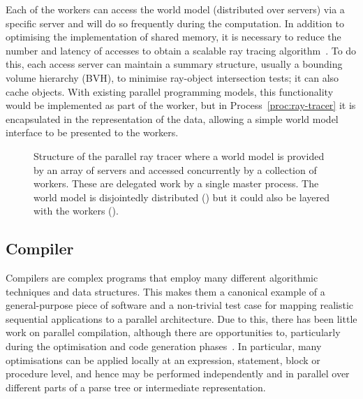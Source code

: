\documentclass[11pt, conference, compsocconf, onecolumn]{IEEEtran}
\newcommand{\proc}[1]{Process~\ref{proc:#1}}
\newcounter{process}
\newcommand{\inputtikz}[1]{
\begin{center}\end{center}}
\begin{document}
Each of the  workers can access the world model (distributed over 
servers) via a specific server and will do so frequently during the
computation. 
In addition to optimising the implementation of shared memory, it is necessary
to reduce the number and latency of accesses to obtain a scalable ray tracing
algorithm~\cite{Reinhard97}. To do this, each access server can maintain a
summary structure, usually a bounding volume hierarchy (BVH), to minimise
ray-object intersection tests; it can also cache objects.
With existing parallel programming models, this functionality would be
implemented as part of the worker, but in \proc{ray-tracer} it is encapsulated
in the representation of the data, allowing a simple world model interface to
be presented to the workers.

\begin{figure}[t]
\inputtikz{figures/ray-tracer}

\caption{Structure of the parallel ray tracer where a world model is provided
by an array of servers and accessed concurrently by a collection of workers.
These are delegated work by a single master process. The world model is
disjointedly distributed () but it could also be layered with the
workers ().}

\label{fig:ray-tracer}
\end{figure}

\subsection{Compiler}



Compilers are complex programs that employ many different algorithmic
techniques and data structures. This makes them a canonical example of a
general-purpose piece of software and a non-trivial test case for mapping
realistic sequential applications to a parallel architecture.  Due to this,
there has been little work on parallel compilation, although there are
opportunities to, particularly during the optimisation and code generation
phases~\cite{Gross89}. In particular, many optimisations can be applied locally
at an expression, statement, block or procedure level, and hence may be
performed independently and in parallel over different parts of a parse tree
or intermediate representation.
\end{document}
